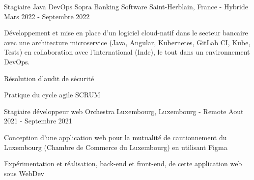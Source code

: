 \begin{cventries}
  \cventry
    {Stagiaire Java DevOps} %
    {Sopra Banking Software} %
    {Saint-Herblain, France - Hybride} %
    {Mars 2022 - Septembre 2022} %
    {
      \begin{cvitems} %
        \item {Développement et mise en place d'un logiciel cloud-natif dans le secteur bancaire avec une architecture microservice (Java, Angular, Kubernetes, GitLab CI, Kube, Tests) en collaboration avec l'international (Inde), le tout dans un environnement DevOps.}
        \item {Résolution d'audit de sécurité}
        \item {Pratique du cycle agile SCRUM}
      \end{cvitems}
    }
    
  \cventry
    {Stagiaire développeur web} %
    {Orchestra} %
    {Luxembourg, Luxembourg - Remote} %
    {Aout 2021 - Septembre 2021} %
    {
      \begin{cvitems} %
        \item {Conception d'une application web pour la mutualité de cautionnement du Luxembourg (Chambre de Commerce du Luxembourg) en utilisant Figma}
        \item {Expérimentation et réalisation, back-end et front-end, de cette application web sous WebDev}
      \end{cvitems}
    }


\end{cventries}
